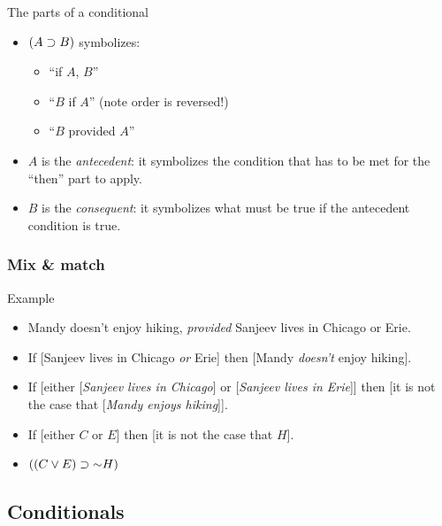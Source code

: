 \begin{frame}{The parts of a conditional}

\begin{itemize}
  \item \emph{$(A \supset B)$} symbolizes:
  \begin{itemize}
    \item ``if $A$, $B$''
    \item ``$B$ if $A$'' (note order is reversed!)
    \item ``$B$ provided $A$''
  \end{itemize}
  \item $A$ is the \emph{antecedent}: it symbolizes the condition that has to
  be met for the ``then'' part to apply.
  \item $B$ is the \emph{consequent}: it symbolizes what must be true
  if the antecedent condition is true.
\end{itemize}
\end{frame}

\begin{frame}
  \frametitle{Mix \& match}

  \begin{block}{Example}
    \begin{itemize}[<+->]
      \item[] Mandy doesn't enjoy hiking, \emph{provided} Sanjeev lives in Chicago or Erie.

  \item[] If [Sanjeev lives in Chicago \emph{or} Erie] then [Mandy \emph{doesn't} enjoy hiking].

  \item[] If [either [\emph{Sanjeev lives in Chicago}] or [\emph{Sanjeev lives in Erie}]]
  then [it is not the case that [\emph{Mandy enjoys hiking}]].

  \item[] If [either $C$ or $E$]
  then [it is not the case that $H$].

  \item[] $((C \lor E) \eif \lnot H)$
  \end{itemize}
  \end{block}

\end{frame}

\subsection{Conditionals}

